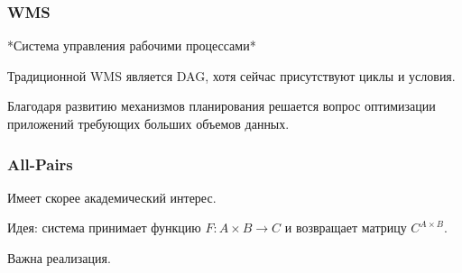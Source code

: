 \subsubsection*{WMS}

*Система управления рабочими процессами*

Традиционной WMS является DAG, хотя сейчас присутствуют циклы и условия.

Благодаря развитию механизмов планирования решается вопрос оптимизации приложений
требующих больших объемов данных.

\subsubsection*{All-Pairs}

Имеет скорее академический интерес.

Идея: система принимает функцию $F: A \times B \to C$ и возвращает матрицу
$C^{A \times B}$.

Важна реализация.